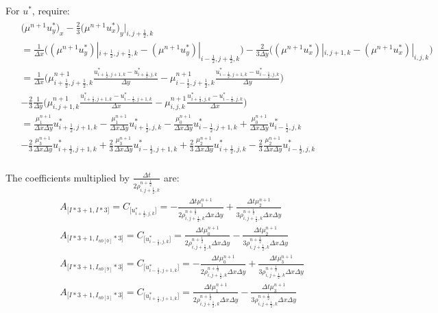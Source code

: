 \documentclass{article}
\numberwithin{equation}{subsection}
\begin{document}
For $u^*$, require:
\begin{align}
\begin{split}
& \Big(\mu^{n+1} u^*_y \Big)_x - \frac{2}{3} \Big( \mu^{n+1} u^*_x \Big)_y |_{i,j+\frac{1}{2},k} \\
& = \frac{1}{\Delta x} \Big( (\mu^{n+1} u^*_y)|_{i+\frac{1}{2},j+\frac{1}{2},k} - (\mu^{n+1}u^*_y)|_{i-\frac{1}{2},j+\frac{1}{2},k}\Big) - \frac{2}{3 \Delta y} \Big( (\mu^{n+1}u^*_x)|_{i,j+1,k} - (\mu^{n+1}u^*_x)|_{i,j,k}\Big) \\
& = \frac {1}{\Delta x} \Big ( \mu^{n+1}_{i+\frac{1}{2},j+\frac{1}{2},k}\frac{u^*_{i+\frac{1}{2},j+1,k} - u^*_{i+\frac{1}{2},j,k}}{\Delta y} - \mu^{n+1}_{i-\frac{1}{2},j+\frac{1}{2},k}\frac{u^*_{i-\frac{1}{2},j+1,k} - u^*_{i-\frac{1}{2},j,k}}{\Delta y} \Big) \\
& - \frac{2}{3}\frac{1}{\Delta y} \Big( \mu^{n+1}_{i,j+1,k}\frac{u^*_{i+\frac{1}{2},j+1,k} - u^*_{i-\frac{1}{2},j+1,k}}{\Delta x} - \mu^{n+1}_{i,j,k}\frac{u^*_{i+\frac{1}{2},j,k} - u^*_{i-\frac{1}{2},j,k}}{\Delta x} \Big)\\
& = \frac{\mu^{n+1}_1}{\Delta x \Delta y}u^*_{i+\frac{1}{2},j+1,k} - \frac{\mu^{n+1}_1}{\Delta x \Delta y}u^*_{i+\frac{1}{2},j,k} - \frac{\mu^{n+1}_0}{\Delta x \Delta y}u^*_{i-\frac{1}{2},j+1,k} + \frac{\mu^{n+1}_0}{\Delta x \Delta y}u^*_{i-\frac{1}{2},j,k} \\
& - \frac{2}{3} \frac{\mu^{n+1}_3}{\Delta x \Delta y}u^*_{i+\frac{1}{2},j+1,k} + \frac{2}{3} \frac{\mu^{n+1}_3}{\Delta x \Delta y}u^*_{i-\frac{1}{2},j+1,k} + \frac{2}{3} \frac{\mu^{n+1}_2}{\Delta x \Delta y}u^*_{i+\frac{1}{2},j,k} - \frac{2}{3}\frac{\mu^{n+1}_2}{\Delta x \Delta y}u^*_{i-\frac{1}{2},j,k}\\
\end{split}
\end{align}

The coefficients multiplied by $\frac{\Delta t}{2\rho^{n+\frac{1}{2}}_{i,j+\frac{1}{2},k}}$ are:
\begin{align}
\begin{split}
& A_{\Big[I*3+1,I*3\Big]} = C_{\Big[u^*_{i+\frac{1}{2},j,k}\Big]} = -\frac{\Delta t \mu^{n+1}_1}{2\rho^{n+\frac{1}{2}}_{i,j+\frac{1}{2},k}\Delta x \Delta y} + \frac{\Delta t \mu^{n+1}_2}{3\rho^{n+\frac{1}{2}}_{i,j+\frac{1}{2},k} \Delta x \Delta y}  \\
& A_{\Big[I*3+1,I_{nb[0]}*3\Big]} = C_{\Big[u^*_{i-\frac{1}{2},j,k}\Big]} = \frac{\Delta t \mu^{n+1}_0}{2\rho^{n+\frac{1}{2}}_{i,j+\frac{1}{2},k} \Delta x \Delta y} - \frac{\Delta t \mu^{n+1}_2}{3\rho^{n+\frac{1}{2}}_{i,j+\frac{1}{2},k} \Delta x \Delta y} \\
& A_{\Big[I*3+1,I_{nb[9]}*3\Big]} = C_{\Big[u^*_{i-\frac{1}{2},j+1,k}\Big]} = -\frac{\Delta t \mu^{n+1}_0}{2\rho^{n+\frac{1}{2}}_{i,j+\frac{1}{2},k}\Delta x \Delta y} + \frac{\Delta t \mu^{n+1}_3}{3\rho^{n+\frac{1}{2}}_{i,j+\frac{1}{2},k}\Delta x \Delta y}\\
& A_{\Big[I*3+1,I_{nb[3]}*3\Big]} = C_{\Big[u^*_{i+\frac{1}{2},j+1,k}\Big]} = \frac{\Delta t \mu^{n+1}_1}{2\rho^{n+\frac{1}{2}}_{i,j+\frac{1}{2},k}\Delta x \Delta y} - \frac{\Delta t \mu^{n+1}_3}{3\rho^{n+\frac{1}{2}}_{i,j+\frac{1}{2},k}\Delta x \Delta y}
\end{split}
\end{align}
\end{document}

